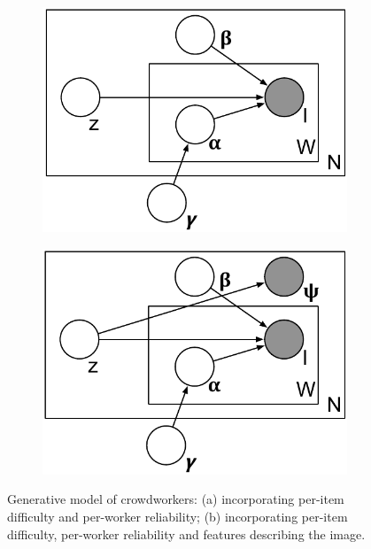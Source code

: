 \documentclass{../acm_proc_article-me11_tweaked}
\begin{document}
\begin{figure}[t]
\centering
\begin{subfigure}[t]{0.48\columnwidth}
	\centering
	\includegraphics[width=0.7\columnwidth]{images/model1}
	\caption{\label{fig:model1}}
\end{subfigure}
\begin{subfigure}[t]{0.48\columnwidth}
	\centering
	\includegraphics[width=0.7\columnwidth]{images/model2}
	\caption{\label{fig:model2}}
\end{subfigure}
\caption{Generative model of crowdworkers: (a) incorporating per-item difficulty and per-worker reliability; (b) incorporating per-item difficulty, per-worker reliability and features describing the image.}
\end{figure}
	
\end{document}
